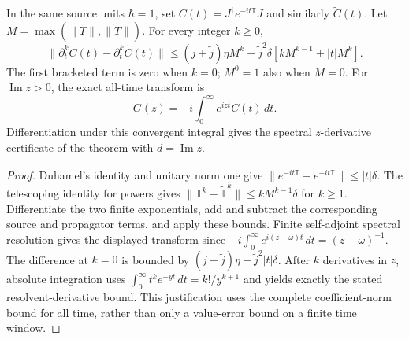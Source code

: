 \documentclass[12pt,a4paper]{article}
\begin{document}
\begin{corollary}
\label{p4:cor:v249-correlation-resolvent-bridge}
In the same source units $\hbar=1$, set
$C(t)=J^\dagger e^{-it\mathbb T}J$ and similarly
$\widetilde C(t)$. Let
$M=\max(\|T\|,\|\widetilde T\|)$. For every integer $k\ge0$,
\[
 \boxed{\|\partial_t^kC(t)-\partial_t^k\widetilde C(t)\|
 \le (j+\widetilde j)\eta M^k
 +\widetilde j^2\delta
       [kM^{k-1}+|t|M^k].}
\]
The first bracketed term is zero when $k=0$; $M^0=1$ also when
$M=0$. For $\operatorname{Im}z>0$, the exact all-time transform is
\[
 \boxed{G(z)=-i\int_0^\infty e^{izt}C(t)\,dt.}
\]
Differentiation under this convergent integral gives the spectral
$z$-derivative certificate of the theorem with
$d=\operatorname{Im}z$.
\end{corollary}
\begin{proof}
Duhamel's identity and unitary norm one give
$\|e^{-it\mathbb T}-e^{-it\widetilde{\mathbb T}}\|
 \le|t|\delta$.
The telescoping identity for powers gives
$\|\mathbb T^k-\widetilde{\mathbb T}^k\|
 \le kM^{k-1}\delta$ for $k\ge1$.
Differentiate the two finite exponentials, add and subtract the
corresponding source and propagator terms, and apply these bounds.
Finite self-adjoint spectral resolution gives the displayed transform
since $-i\int_0^\infty e^{i(z-\omega)t}\,dt=(z-\omega)^{-1}$.
The difference at $k=0$ is bounded by
$(j+\widetilde j)\eta+\widetilde j^2|t|\delta$.
After $k$ derivatives in $z$, absolute integration uses
$\int_0^\infty t^ke^{-yt}\,dt=k!/y^{k+1}$ and yields exactly
the stated resolvent-derivative bound. This justification uses the
complete coefficient-norm bound for all time, rather than only a
value-error bound on a finite time window.
\end{proof}
\end{document}
